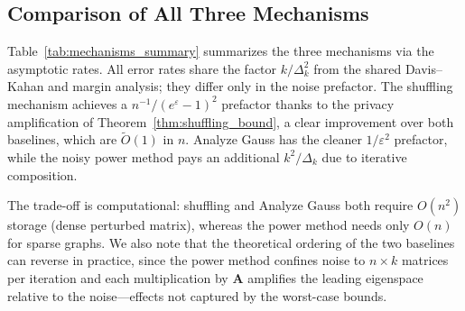 \documentclass[11pt]{article}
\theoremstyle{plain}
\newtheorem{theorem}{Theorem}[section]
\theoremstyle{definition}
\theoremstyle{remark}
\begin{document}



\subsection{Comparison of All Three Mechanisms}


Table~\ref{tab:mechanisms_summary} summarizes the three mechanisms via the asymptotic rates. All error rates share the factor $k/\Delta_k^2$ from the shared Davis--Kahan and margin analysis; they differ only in the noise prefactor. The shuffling mechanism achieves a $n^{-1}/(e^\varepsilon - 1)^2$ prefactor thanks to the privacy amplification of Theorem~\ref{thm:shuffling_bound}, a clear improvement over both baselines, which are $\tilde O(1)$ in $n$. Analyze Gauss has the cleaner $1/\varepsilon^2$ prefactor, while the noisy power method pays an additional $k^2/\Delta_k$ due to iterative composition. 

The trade-off is computational: shuffling and Analyze Gauss both require $O(n^2)$ storage (dense perturbed matrix), whereas the power method needs only $O(n)$ for sparse graphs. We also note that the theoretical ordering of the two baselines can reverse in practice, since the power method confines noise to $n \times k$ matrices per iteration and each multiplication by $\mathbf{A}$ amplifies the leading eigenspace relative to the noise---effects not captured by the worst-case bounds.
\end{document}
